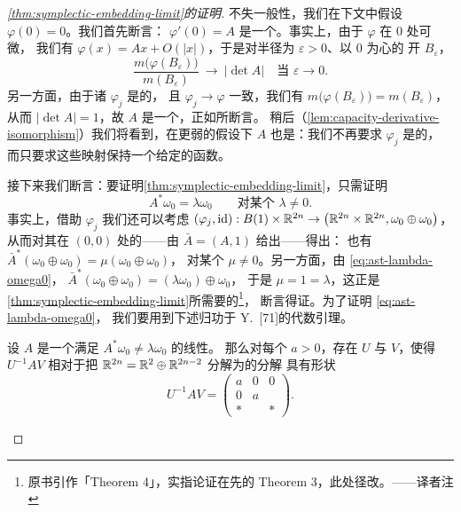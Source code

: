 \begin{proof}[\cref*{thm:symplectic-embedding-limit}的证明]
不失一般性，我们在下文中假设 $\varphi(0)=0$。我们首先断言：%
\trLinear\trMapping{} $\varphi'(0)=A$ 是一个\trIsomorphism。事实上，由于 $\varphi$ 在 $0$ 处可微，%
我们有 $\varphi(x)=Ax+O(|x|)$，于是对半径为 $\varepsilon>0$、以 $0$ 为心的%
开\trBall{} $B_{\varepsilon}$，
\[
\frac{m\bigl(\varphi(B_{\varepsilon})\bigr)}{m(B_{\varepsilon})}
\ \longrightarrow\ \bigl|\det A\bigr|\quad\text{当 }\varepsilon\to0.
\]
另一方面，由于诸\trSymplecticDiffeomorphism{} $\varphi_j$ 是\trVolumePreserving{}的，%
且 $\varphi_j\to\varphi$ 一致，我们有 $m\bigl(\varphi(B_{\varepsilon})\bigr)=m(B_{\varepsilon})$，%
从而 $|\det A|=1$，故 $A$ 是一个\trIsomorphism，正如所断言。%
稍后（\cref{lem:capacity-derivative-isomorphism}）我们将看到，在更弱的假设下%
$A$ 也是\trIsomorphism：我们不再要求 $\varphi_j$ 是\trSymplectic{}的，%
而只要求这些映射保持一个给定的\trCapacity{}函数。

接下来我们断言：要证明\cref{thm:symplectic-embedding-limit}，只需证明
\begin{equation}\label{eq:ast-lambda-omega0}
A^{*}\omega_0=\lambda\omega_0\qquad\text{对某个 }\lambda\neq0.
\end{equation}
事实上，借助 $\varphi_j$ 我们还可以考虑\trSymplecticEmbedding{}%
$(\varphi_j,\mathrm{id}):B(1)\times\mathbb{R}^{2n}\to\bigl(\mathbb{R}^{2n}\times\mathbb{R}^{2n},\omega_0\oplus\omega_0\bigr)$，%
从而对其在 $(0,0)$ 处的\trDerivative{}——由 $\bar{A}=(A,1)$ 给出——得出：%
也有 $\bar{A}^{*}(\omega_0\oplus\omega_0)=\mu(\omega_0\oplus\omega_0)$，%
对某个 $\mu\neq0$。另一方面，由 \eqref{eq:ast-lambda-omega0}，%
$\bar{A}^{*}(\omega_0\oplus\omega_0)=(\lambda\omega_0)\oplus\omega_0$，%
于是 $\mu=1=\lambda$，这正是\cref{thm:symplectic-embedding-limit}所需要的\footnote{原书引作「Theorem 4」，实指论证在先的 Theorem 3，此处径改。——译者注}，%
断言得证。为了证明 \eqref{eq:ast-lambda-omega0}，%
我们要用到下述归功于 Y.~\trEliashberg{}[71]的代数引理。

\begin{lemma}\label{lem:eliashberg-algebraic}
设 $A$ 是一个满足 $A^{*}\omega_0\neq\lambda\omega_0$ 的线性\trIsomorphism。%
那么对每个 $a>0$，存在\trSymplecticMatrix{} $U$ 与 $V$，使得 $U^{-1}AV$%
相对于把 $\mathbb{R}^{2n}=\mathbb{R}^{2}\oplus\mathbb{R}^{2n-2}$ 分解为\trSymplectic\trSubspace{}的分解%
具有形状
\[
U^{-1}AV=\left(\begin{array}{cc|c}
a & 0 & 0\\
0 & a & \\
\hline
* &   & *
\end{array}\right).
\]
\end{lemma}


\end{proof}
